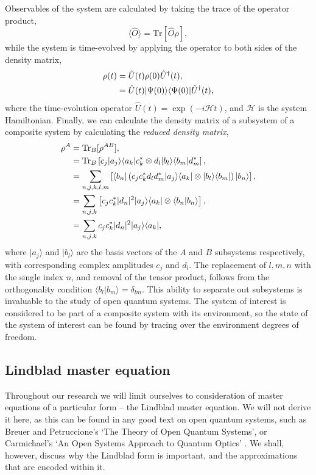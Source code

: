 Observables of the system are calculated by taking the trace of the operator product,
\begin{equation}
	\langle \hat{O} \rangle = \mathrm{Tr}[\hat{O}\rho],
	\label{eq:oqs2-5}
\end{equation}
while the system is time-evolved by applying the operator to both sides of the density matrix,
\begin{align}
	\rho (t) &= \hat{U}(t) \rho(0) \hat{U}^{\dagger}(t), \notag \\
	&= \hat{U}(t) | \Psi(0) \rangle \langle \Psi(0) | \hat{U}^{\dagger}(t),
	\label{eq:oqs2-6}
\end{align}
where the time-evolution operator \(\hat{U}(t) = \exp(-i\mathcal{H}t)\), and \(\mathcal{H}\) is the system Hamiltonian. Finally, we can calculate the density matrix of a subsystem of a composite system by calculating the \emph{reduced density matrix},
\begin{align}
	\rho^{A} &= \mathrm{Tr}_{B}[\rho^{AB}], \notag \\
	&= \mathrm{Tr}_{B}\left[ c_{j}|a_{j} \rangle \langle a_{k}|c_{k}^{*} \otimes d_{l}|b_{l} \rangle \langle b_{m}|d_{m}^{*} \right], \notag \\
	&= \sum_{n,j,k,l,m}\left[ \langle b_{n} | \left( c_{j}c_{k}^{*}d_{l}d_{m}^{*} |a_{j} \rangle \langle a_{k}| \otimes |b_{l} \rangle \langle b_{m}| \right) | b_{n} \rangle \right], \notag \\
	&= \sum_{n,j,k} \left[ c_{j}c_{k}^{*}|d_{n}|^{2} |a_{j} \rangle \langle a_{k}| \otimes \langle b_{n} | b_{n} \rangle \right], \notag \\
	&= \sum_{n,j,k} c_{j}c_{k}^{*}|d_{n}|^{2} |a_{j} \rangle \langle a_{k}|,
	\label{eq:oqs2-7}
\end{align}
where \(|a_{j} \rangle\) and \(|b_{l} \rangle\) are the basis vectors of the \(A\) and \(B\) subsystems respectively, with corresponding complex amplitudes \(c_{j}\) and \(d_{l}\). The replacement of \(l,m,n\) with the single index \(n\), and removal of the tensor product, follows from the orthogonality condition \(\langle b_{l} | b_{m} \rangle = \delta_{lm}\). This ability to separate out subsystems is invaluable to the study of open quantum systems. The system of interest is considered to be part of a composite system with its environment, so the state of the system of interest can be found by tracing over the environment degrees of freedom.

\subsection{\label{sec:lindblad}Lindblad master equation}
Throughout our research we will limit ourselves to consideration of master equations of a particular form -- the Lindblad master equation. We will not derive it here, as this can be found in any good text on open quantum systems, such as Breuer and Petruccione's `The Theory of Open Quantum Systems', or Carmichael's `An Open Systems Approach to Quantum Optics' \cite{BP_TMQME,Carmichael_OSAQO}. We shall, however, discuss why the Lindblad form is important, and the approximations that are encoded within it.

